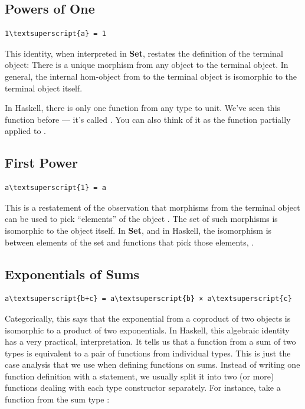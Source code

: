 \subsection{Powers of One}\label{powers-of-one}

\begin{Verbatim}[commandchars=\\\{\}]
1\textsuperscript{a} = 1
\end{Verbatim}
This identity, when interpreted in \textbf{Set}, restates the definition
of the terminal object: There is a unique morphism from any object to
the terminal object. In general, the internal hom-object from 
to the terminal object is isomorphic to the terminal object itself.

In Haskell, there is only one function from any type  to unit.
We've seen this function before --- it's called . You can
also think of it as the function  partially applied to
\code{()}.

\subsection{First Power}\label{first-power}

\begin{Verbatim}[commandchars=\\\{\}]
a\textsuperscript{1} = a
\end{Verbatim}
This is a restatement of the observation that morphisms from the
terminal object can be used to pick ``elements'' of the object
. The set of such morphisms is isomorphic to the object
itself. In \textbf{Set}, and in Haskell, the isomorphism is between
elements of the set  and functions that pick those elements,
.

\subsection{Exponentials of Sums}\label{exponentials-of-sums}

\begin{Verbatim}[commandchars=\\\{\}]
a\textsuperscript{b+c} = a\textsuperscript{b} × a\textsuperscript{c}
\end{Verbatim}
Categorically, this says that the exponential from a coproduct of two
objects is isomorphic to a product of two exponentials. In Haskell, this
algebraic identity has a very practical, interpretation. It tells us
that a function from a sum of two types is equivalent to a pair of
functions from individual types. This is just the case analysis that we
use when defining functions on sums. Instead of writing one function
definition with a  statement, we usually split it into two
(or more) functions dealing with each type constructor separately. For
instance, take a function from the sum type
:

